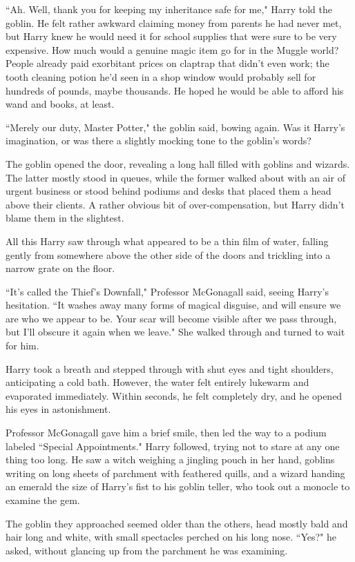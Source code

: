 ``Ah. Well, thank you for keeping my inheritance safe for
me," Harry told the goblin. He felt rather awkward claiming
money from parents he had never met, but Harry knew he
would need it for school supplies that were sure to be
very expensive. How much would a genuine magic item go
for in the Muggle world? People already paid exorbitant
prices on claptrap that didn't even work; the tooth cleaning
potion he'd seen in a shop window would probably sell for
hundreds of pounds, maybe thousands. He hoped he
would be able to afford his wand and books, at least.

``Merely our duty, Master Potter," the goblin said,
bowing again. Was it Harry's imagination, or was there a
slightly mocking tone to the goblin's words?

The goblin opened the door, revealing a long hall filled with
goblins and wizards. The latter mostly stood in queues,
while the former walked about with an air of urgent
business or stood behind podiums and desks that placed
them a head above their clients. A rather obvious bit of
over-compensation, but Harry didn't blame them in the slightest.

All this Harry saw through what appeared to be a thin film
of water, falling gently from somewhere above the other
side of the doors and trickling into a narrow grate on the floor.

``It's called the Thief's Downfall," Professor McGonagall said,
seeing Harry's hesitation. ``It washes away many forms of
magical disguise, and will ensure we are who we appear
to be. Your scar will become visible after we pass through,
but I'll obscure it again when we leave." She walked
through and turned to wait for him.

Harry took a breath and stepped through with shut eyes and tight
shoulders, anticipating a cold bath. However, the water felt entirely
lukewarm and evaporated immediately. Within seconds, he felt completely
dry, and he opened his eyes in astonishment.

Professor McGonagall gave him a brief smile, then led the
way to a podium labeled ``Special Appointments." Harry
followed, trying not to stare at any one thing too long. He
saw a witch weighing a jingling pouch in her hand, goblins
writing on long sheets of parchment with feathered quills,
and a wizard handing an emerald the size of Harry's fist
to his goblin teller, who took out a monocle to examine the gem.

The goblin they approached seemed older than the others,
head mostly bald and hair long and white, with small
spectacles perched on his long nose. ``Yes?" he asked,
without glancing up from the parchment he was examining.

